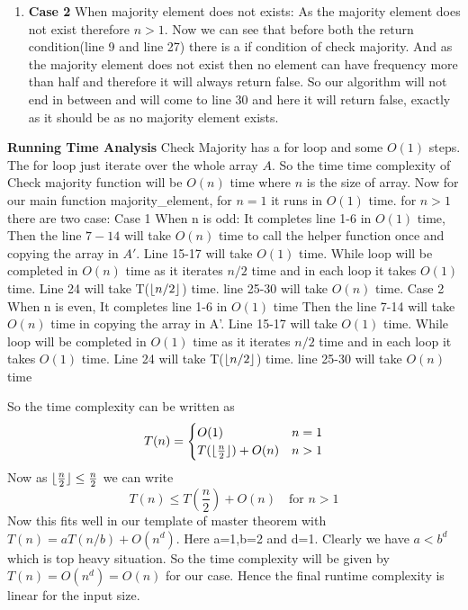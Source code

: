 \documentclass[answers]{exam}
\begin{document}
\begin{questions}
\begin{parts}
\begin{solution}
\begin{enumerate}
\item \textbf{Case 2} When majority element does not exists:
\newline As the majority element does not exist therefore $n>1$. Now we can see that before both the return condition(line 9 and line 27) there is a if condition of check majority. And as the majority element does not exist then no element can have frequency more than half and therefore it will always return false. So our algorithm will not end in between and will come to line 30 and here it will return false, exactly as it should be as no majority element exists.
\end{enumerate}

\textbf{Running Time Analysis}
\newline Check Majority has a for loop and some $O(1)$ steps. The for loop just iterate over the whole array $A$. So the time time complexity of Check majority function will be $O(n)$ time where $n$ is the size of array.
\newline Now for our main function majority\_element, for $n=1$ it runs in $O(1)$ time. for $n>1$ there are two case:
\newline Case 1 When n is odd: It completes line 1-6 in $O(1)$ time, Then the line $7-14$ will take $O(n)$ time to call the helper function once and copying the array in $A'$. Line 15-17 will take $O(1)$ time. While loop will be completed in $O(n)$ time as it iterates $n/2$ time and in each loop it takes $O(1)$ time. Line 24 will take T($\lfloor n/2\rfloor$) time. line 25-30 will take $O(n)$ time.
\newline Case 2 When n is even, It completes line 1-6 in $O(1)$ time Then the line 7-14 will take $O(n)$ time in copying the array in A'. Line 15-17 will take $O(1)$ time. While loop will be completed in $O(1)$ time as it iterates $n/2$ time and in each loop it takes $O(1)$ time. Line 24 will take T($\lfloor n/2\rfloor$) time. line 25-30 will take $O(n)$ time

So the time complexity can be written as  
\[
    T(n) = 
    \begin{cases}
        O(1) & n=1 \\
    T(\lfloor\frac{n}{2}\rfloor) + O(n) & n > 1 \\
    \end{cases}
\]
Now as $\lfloor\frac{n}{2}\rfloor \leq \frac{n}{2}$ we can write 
\[
T(n) \leq T(\frac{n}{2})+O(n) \quad \text{for } n>1
\]
Now this fits well in our template of master theorem with $T(n)=aT(n/b)+O(n^{d})$. Here a=1,b=2 and d=1. Clearly we have $a<b^{d}$ which is top heavy situation. So the time complexity will be given by$T(n)=O(n^{d})= O(n)$ for our case. Hence the final runtime complexity is linear for the input size. 
\end{solution}



\end{parts}
\end{questions}
\end{document}

